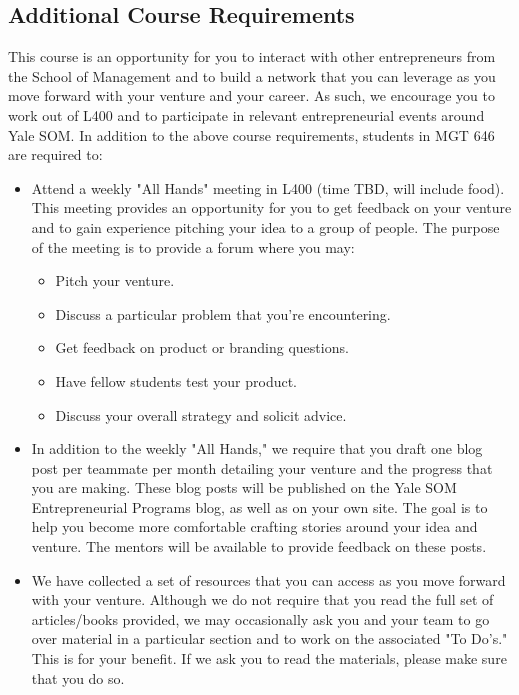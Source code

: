\subsection*{Additional Course Requirements}

This course is an opportunity for you to interact with other entrepreneurs from the School of Management and to build a network that you can leverage as you move forward with your venture and your career. As such, we encourage you to work out of L400 and to participate in relevant entrepreneurial events around Yale SOM. In addition to the above course requirements, students in MGT 646 are required to:

\begin{itemize}
	\item Attend a weekly "All Hands" meeting in L400 (time TBD, will include food). This meeting provides an opportunity for you to get feedback on your venture and to gain experience pitching your idea to a group of people. The purpose of the meeting is to provide a forum where you may:
		\begin{itemize}
				\item Pitch your venture.
				\item Discuss a particular problem that you're encountering.
				\item Get feedback on product or branding questions.
				\item Have fellow students test your product.
				\item Discuss your overall strategy and solicit advice.
			\end{itemize}
	\item In addition to the weekly "All Hands," we require that you draft one blog post per teammate per month detailing your venture and the progress that you are making. These blog posts will be published on the Yale SOM Entrepreneurial Programs blog, as well as on your own site. The goal is to help you become more comfortable crafting stories around your idea and venture. The mentors will be available to provide feedback on these posts.
	\item We have collected a set of resources that you can access as you move forward with your venture. Although we do not require that you read the full set of articles/books provided, we may occasionally ask you and your team to go over material in a particular section and to work on the associated "To Do's." This is for your benefit. If we ask you to read the materials, please make sure that you do so.

\end{itemize}


